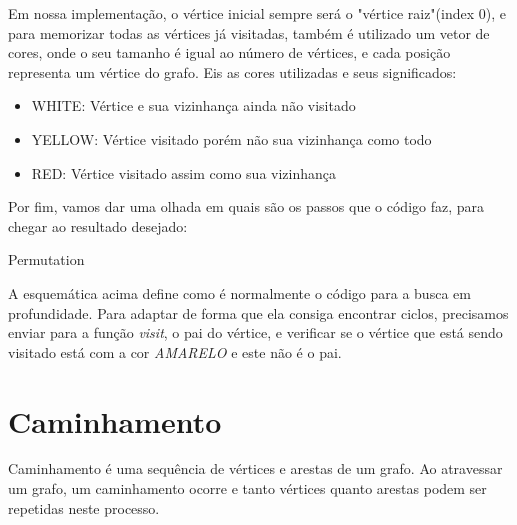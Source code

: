 \documentclass[12pt]{article}
\begin{document}
    Em nossa implementação, o vértice inicial sempre será o "vértice raiz"(index 0), 
    e para memorizar todas as vértices já visitadas, também é utilizado um vetor de cores,
    onde o seu tamanho é igual ao número de vértices, e cada posição representa um vértice do 
    grafo. Eis as cores utilizadas e seus significados:

    \begin{itemize}
      \item WHITE: Vértice e sua vizinhança ainda não visitado 
      \item YELLOW: Vértice visitado porém não sua vizinhança como todo
      \item RED: Vértice visitado assim como sua vizinhança
    \end{itemize}

    Por fim, vamos dar uma olhada em quais são os passos que o código 
    faz, para chegar ao resultado desejado:

    \begin{algorithm}
      \caption{Permutation} \label{euclid}
      \begin{algorithmic}[1]
      \EndIf
      \EndFor
      \EndProcedure
      \EndIf
      \EndFor
      \EndProcedure
      \end{algorithmic}
    \end{algorithm}

    A esquemática acima define como é normalmente o código para a busca em profundidade. 
    Para adaptar de forma que ela consiga encontrar ciclos, precisamos enviar para a 
    função \emph{visit}, o pai do vértice, e verificar se o vértice que está sendo visitado 
    está com a cor \emph{AMARELO} e este não é o pai.

  \section{Caminhamento} \label{sec:walking}

  Caminhamento é uma sequência de vértices e arestas de um grafo. Ao atravessar um grafo,
  um caminhamento ocorre e tanto vértices quanto arestas podem ser repetidas neste processo.
\end{document}
